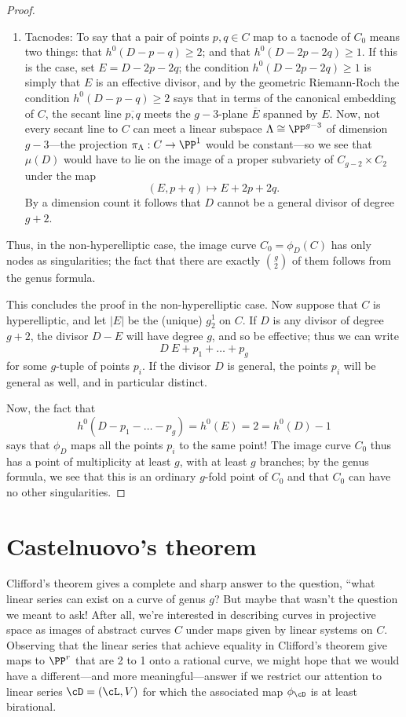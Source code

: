 \begin{proof}
\begin{enumerate}
\item Tacnodes:  To say that a pair of points $p, q \in C$ map to a tacnode of $C_0$ means two things: that $h^0(D-p-q) \geq 2$; and that $h^0(D-2p-2q) \geq 1$. If this is the case, set $E = D - 2p - 2q$;  the condition $h^0(D-2p-2q) \geq 1$ is simply that $E$ is an effective divisor, and by the geometric Riemann-Roch the condition $h^0(D-p-q) \geq 2$ says that in terms of the canonical embedding of $C$, the secant line $\overline{p,q}$ meets the $g-3$-plane $\overline E$ spanned by $E$. Now, not every secant line to $C$ can meet a linear subspace $\Lambda \cong \PP^{g-3}$ of dimension $g-3$---the projection $\pi_\Lambda : C \to \PP^1$ would be constant---so we see that $\mu(D)$ would have to lie on the image of a proper subvariety of $C_{g-2} \times C_2$ under the map 
$$
(E, p+q) \mapsto E+2p+2q.
$$
By a dimension count it follows that $D$ cannot be a general divisor of degree $g+2$.

\end{enumerate}

Thus, in the non-hyperelliptic case, the image curve $C_0 = \phi_D(C)$ has only nodes as singularities; the fact that there are exactly $\binom{g}{2}$ of them follows from the genus formula.


This concludes the proof in the non-hyperelliptic case. Now suppose that $C$ is hyperelliptic, and let $|E|$ be the (unique) $g^1_2$ on $C$. If  $D$ is any divisor of degree $g+2$, the divisor $D - E$ will have degree $g$, and so be effective; thus we can write
$$
D ~ E + p_1 + \dots + p_g
$$
for some $g$-tuple of points $p_i$. If the divisor $D$ is general, the points $p_i$ will be general as well, and in particular distinct.

Now, the fact that
$$
h^0(D - p_1 - \dots - p_g) = h^0(E) = 2 = h^0(D) - 1
$$
says that $\phi_D$ maps all the points $p_i$ to the same point! The image curve $C_0$ thus has a point of multiplicity at least $g$, with at least $g$ branches; by the genus formula, we see that this is an ordinary $g$-fold point of $C_0$ and that $C_0$ can have no other singularities.

\end{proof}





\section{Castelnuovo's theorem}

Clifford's theorem gives a complete and sharp answer to the question, ``what linear series can exist on a curve of genus $g$?
But maybe that wasn't the question we meant to ask! After all, we're interested in describing curves in projective space as images of abstract curves $C$ under maps given by linear systems on $C$. Observing that the linear series that achieve equality in Clifford's theorem give maps to $\PP^r$ that are 2 to 1 onto a rational curve, we might hope that we would have a different---and more meaningful---answer if we  restrict our attention to linear series $\cD = (\cL,V)$ for which the associated map $\phi_\cD$ is at least  birational. 

